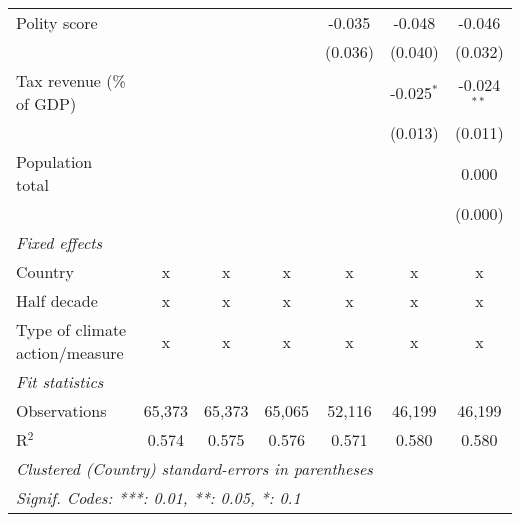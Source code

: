 \begin{tabular}{lcccccc}
   Polity score                                                             &         &                &                & -0.035        & -0.048         & -0.046\\   
                                                                            &         &                &                & (0.036)       & (0.040)        & (0.032)\\   
   Tax revenue (\% of GDP)                                                  &         &                &                &               & -0.025$^{*}$   & -0.024$^{**}$\\   
                                                                            &         &                &                &               & (0.013)        & (0.011)\\   
   Population total                                                         &         &                &                &               &                & 0.000\\   
                                                                            &         &                &                &               &                & (0.000)\\   
   \emph{Fixed effects}\\
   Country                                                                  & x       & x              & x              & x             & x              & x\\  
   Half decade                                                              & x       & x              & x              & x             & x              & x\\  
   Type of climate action/measure                                           & x       & x              & x              & x             & x              & x\\  
   \midrule \emph{Fit statistics}\\
   Observations                                                             & 65,373  & 65,373         & 65,065         & 52,116        & 46,199         & 46,199\\  
   R$^2$                                                                    & 0.574   & 0.575          & 0.576          & 0.571         & 0.580          & 0.580\\  
   \midrule
   \multicolumn{7}{l}{\emph{Clustered (Country) standard-errors in parentheses}}\\
   \multicolumn{7}{l}{\emph{Signif. Codes: ***: 0.01, **: 0.05, *: 0.1}}\\
\end{tabular}
\par\endgroup


